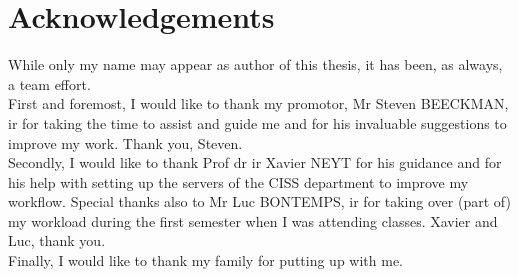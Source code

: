 \chapter*{Acknowledgements}
While only my name may appear as author of this thesis, it has been, as always, a team effort.\\
First and foremost, I would like to thank my promotor, Mr Steven BEECKMAN, ir for taking the time to assist and guide me and for his invaluable suggestions to improve my work. Thank you, Steven.\\
Secondly, I would like to thank Prof dr ir  Xavier NEYT for his guidance and for his help with setting up the servers of the CISS department to improve my workflow. Special thanks also to Mr Luc BONTEMPS, ir for taking over (part of) my workload during the first semester when I was attending classes. Xavier and Luc, thank you.\\
Finally, I would like to thank my family for putting up with me.


